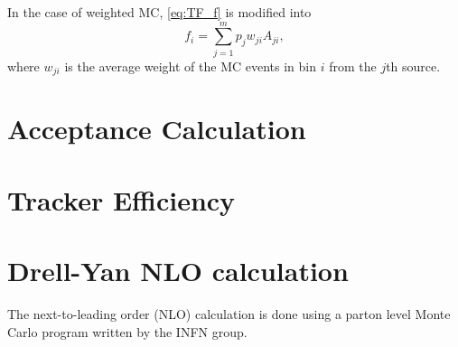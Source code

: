 \documentclass[../main.tex]{subfiles}
\begin{document}
In the case of weighted MC, \cref{eq:TF_f} is modified into
\begin{equation}
	f_i = \sum^m_{j=1} p_j w_{ji}A_{ji},
\end{equation}
where $w_{ji}$ is the average weight of the MC events in bin $i$ from the $j$th source.

\section{Acceptance Calculation}

\section{Tracker Efficiency}

\section{Drell-Yan NLO calculation}
The next-to-leading order (NLO) calculation is done using a parton level Monte
Carlo program written by the INFN group\cite{catani2009,catani2007}.

\ifSubfilesClassLoaded{ \printbibliography[heading=bibintoc,title={References}]}{}
\end{document}
